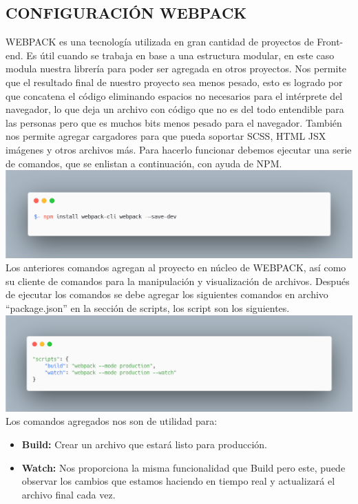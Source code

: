 \subsection{CONFIGURACIÓN WEBPACK}
WEBPACK es una tecnología utilizada en gran cantidad de proyectos de Front-end. Es útil cuando se trabaja en base a una estructura modular, en este caso modula nuestra librería para poder ser agregada en otros proyectos. Nos permite que el resultado final de nuestro proyecto sea menos pesado, esto es logrado por que concatena el código eliminando espacios no necesarios para el intérprete del navegador, lo que deja un archivo con código que no es del todo entendible para las personas pero que es muchos bits menos pesado para el navegador.
También nos permite agregar cargadores para que pueda soportar SCSS, HTML JSX imágenes y otros archivos más.
Para hacerlo funcionar debemos ejecutar una serie de comandos, que se enlistan a continuación, con ayuda de NPM.
\newline
\newline
\includegraphics[width=1\textwidth]{./Imagenes/image3.png}
\newline
Los anteriores comandos agregan al proyecto en núcleo de WEBPACK, así como su cliente de comandos para la manipulación y visualización de archivos. Después de ejecutar los comandos se debe agregar los siguientes comandos en archivo “package.json”  en la sección de scripts, los script son los siguientes.
\newline
\newline
\includegraphics[width=1\textwidth]{./Imagenes/image6.png}
\newline
Los comandos agregados nos son de utilidad para:
\begin{itemize}
\item \textbf{Build:} Crear un archivo que estará listo para producción.
\item \textbf{Watch:} Nos proporciona la misma funcionalidad que Build pero este, puede observar los cambios que estamos haciendo en tiempo real y actualizará el archivo final cada vez.
\end{itemize}
